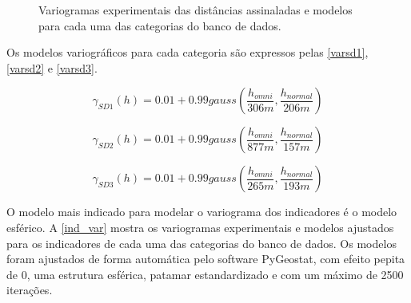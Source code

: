 \begin{figure} 
\caption{Variogramas experimentais das distâncias assinaladas e modelos para cada uma das categorias do banco de dados.} \label{sd_var}
     \centering
\end{figure}

Os modelos variográficos para cada categoria são expressos pelas \autoref{varsd1}, \autoref{varsd2} e \autoref{varsd3}.

\begin{equation}
\label{varsd1}
\gamma_{SD1}(h)=0.01+0.99gauss\left(\frac{h_{omni}}{306m}, \frac{h_{normal}}{206m}\right)
\end{equation}

\begin{equation}
\label{varsd2}
\gamma_{SD2}(h)=0.01+0.99gauss\left(\frac{h_{omni}}{877m}, \frac{h_{normal}}{157m}\right)
\end{equation}

\begin{equation}
\label{varsd3}
\gamma_{SD3}(h)=0.01+0.99gauss\left(\frac{h_{omni}}{265m}, \frac{h_{normal}}{193m}\right)
\end{equation}

O modelo mais indicado para modelar o variograma dos indicadores é o modelo esférico. A \autoref{ind_var} mostra os variogramas experimentais e modelos ajustados para os indicadores de cada uma das categorias do banco de dados. Os modelos foram ajustados de forma automática pelo software PyGeostat, com efeito pepita de 0, uma estrutura esférica, patamar estandardizado e com um máximo de 2500 iterações. 

